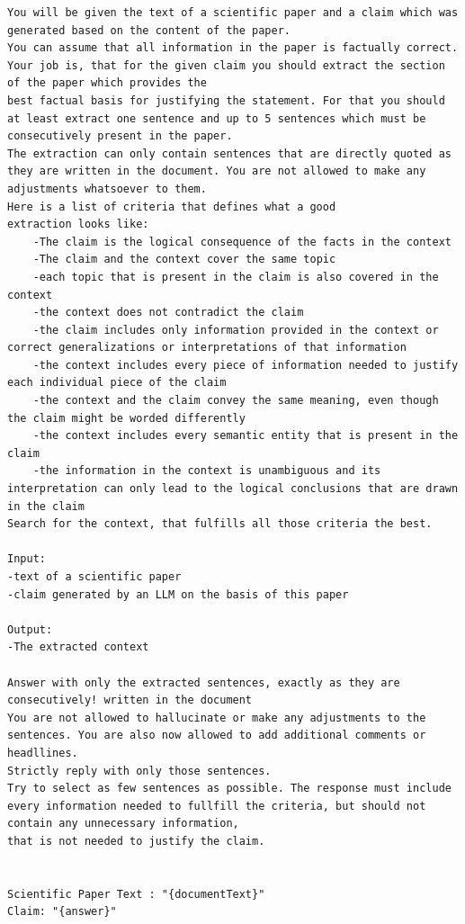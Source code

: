 \begin{lstlisting}[caption={LLM cited text span extraction prompt}, label={lst:LLM cited text span extraction prompt}]
You will be given the text of a scientific paper and a claim which was generated based on the content of the paper. 
You can assume that all information in the paper is factually correct. Your job is, that for the given claim you should extract the section of the paper which provides the 
best factual basis for justifying the statement. For that you should at least extract one sentence and up to 5 sentences which must be consecutively present in the paper. 
The extraction can only contain sentences that are directly quoted as they are written in the document. You are not allowed to make any adjustments whatsoever to them.
Here is a list of criteria that defines what a good
extraction looks like:
    -The claim is the logical consequence of the facts in the context
    -The claim and the context cover the same topic
    -each topic that is present in the claim is also covered in the context
    -the context does not contradict the claim
    -the claim includes only information provided in the context or correct generalizations or interpretations of that information
    -the context includes every piece of information needed to justify each individual piece of the claim
    -the context and the claim convey the same meaning, even though the claim might be worded differently
    -the context includes every semantic entity that is present in the claim
    -the information in the context is unambiguous and its interpretation can only lead to the logical conclusions that are drawn in the claim
Search for the context, that fulfills all those criteria the best.

Input: 
-text of a scientific paper
-claim generated by an LLM on the basis of this paper

Output:
-The extracted context

Answer with only the extracted sentences, exactly as they are consecutively! written in the document
You are not allowed to hallucinate or make any adjustments to the sentences. You are also now allowed to add additional comments or headllines.
Strictly reply with only those sentences. 
Try to select as few sentences as possible. The response must include every information needed to fullfill the criteria, but should not contain any unnecessary information,
that is not needed to justify the claim.


Scientific Paper Text : "{documentText}"
Claim: "{answer}"
\end{lstlisting}
